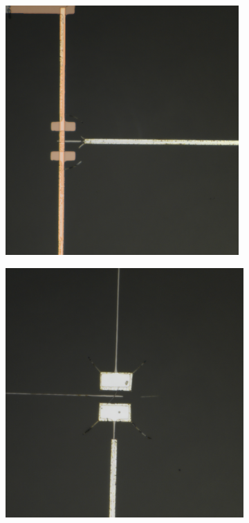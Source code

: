 \begin{figure}[h!]
    \centering
    \begin{subfigure}[b]{0.48\textwidth}
         \centering
        \includegraphics[width=0.98\textwidth]{Pic/Ta_millingtest.png}
        \caption{}
        \label{fig:my_label}
     \end{subfigure}
     \hfill
     \begin{subfigure}[b]{0.48\textwidth}
         \centering
         \includegraphics[width=\textwidth]{Pic/Ta_millingtest_Nw.png}

\end{subfigure}
\end{figure}
